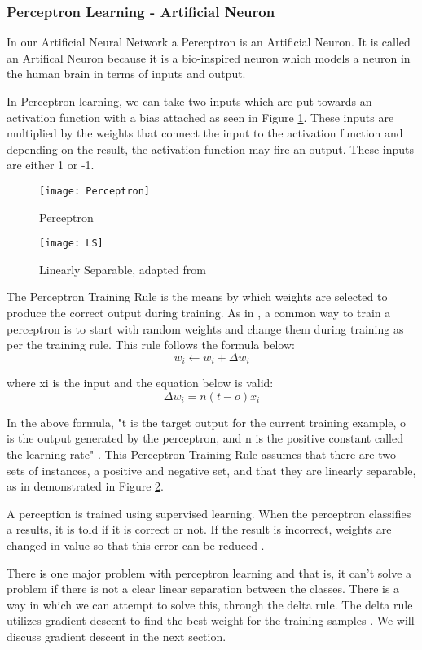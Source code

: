 \subsubsection*{Perceptron Learning - Artificial Neuron}
In our Artificial Neural Network a Perecptron is an Artificial Neuron.
It is called an Artifical Neuron because it is a bio-inspired neuron which models
a neuron in the human brain in terms of inputs and output.

In Perceptron learning, we can take two inputs which are put towards an
activation function with a bias attached as seen in Figure \ref{fig:perceptron}.
These inputs are multiplied by the weights that connect the input to the
activation function and depending on the result, the activation function may
fire an output. These inputs are either 1 or -1.

\begin{figure}[h]
     \texttt{[image: Perceptron]}
     \caption{Perceptron}
     \label{fig:perceptron}
\end{figure}

\begin{figure}
    \texttt{[image: LS]}
     \caption{Linearly Separable, adapted from \textcite{MLANN}}
     \label{fig:ls}
\end{figure}

The Perceptron Training Rule is the means by which weights are selected to produce the correct output during training.
As in \textcite{MLANN}, a common way to train a perceptron is to start with random weights and change them during training as per the training rule.
This rule follows the formula below:
\[w_{i} \leftarrow w_{i} + \Delta w_{i}\]

where xi is the input and the equation below is valid:
\[\Delta w_{i} = n(t-o)x_{i}\]

In the above formula, "t is the target output for the current training example, o is the output generated by the perceptron, and n is the positive constant called the learning rate" \textcite{MLANN}.
This Perceptron Training Rule assumes that there are two sets of instances, a
positive and negative set, and that they are linearly separable, as in demonstrated in Figure \ref{fig:ls}.

A perception is trained using supervised learning. When the perceptron
classifies a results, it is told if it is correct or not. If the result is
incorrect, weights are changed in value so that this error can be reduced
\textcite{AI}. 

There is one major problem with perceptron learning and that is, it can't solve
a problem if there is not a clear linear separation between the classes. There
is a way in which we can attempt to solve this, through the delta rule. The
delta rule utilizes gradient descent to find the best weight for the training
samples \textcite{MLANN}. We will discuss gradient descent in the next section.

